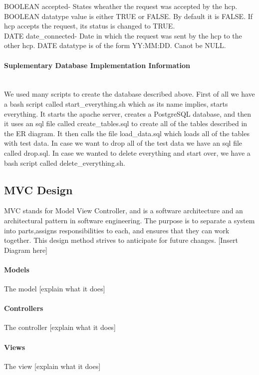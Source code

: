 \documentclass[12pt]{report}
\begin{document}
BOOLEAN accepted- States wheather the request was accepted by the hcp.  BOOLEAN datatype value is either TRUE or FALSE.  By default it is FALSE.  If hcp accepts the request, its status is changed to TRUE.\\

DATE date_connected- Date in which the request was sent by the hcp to the other hcp.  DATE datatype is of the form YY:MM:DD.  Canot be NULL.\\

\paragraph{Suplementary Database Implementation Information}\\
We used many scripts to create the database described above.  First of all we have a bash script called start_everything.sh which as its name implies, starts everything.  It starts the apache server, creates a PostgreSQL database, and then it uses an sql file called create_tables.sql to create all of the tables described in the ER diagram.  It then calls the file load_data.sql which loads all of the tables with test data.  In case we want to drop all of the test data we have an sql file called drop.sql.  In case we wanted to delete everything and start over, we have a bash script called delete_everything.sh.     

\subsection{MVC Design}

MVC stands for Model View Controller, and is a software architecture and an architectural pattern in software engineering. The purpose is to separate a system into parts,assigns responsibilities to each, and ensures that they can work together. This design method strives to anticipate for future changes. 
[Insert Diagram here]
\paragraph{Models}
The model [explain what it does]

\paragraph{Controllers}
The controller [explain what it does]

\paragraph{Views}
The view [explain what it does]
\end{document}
